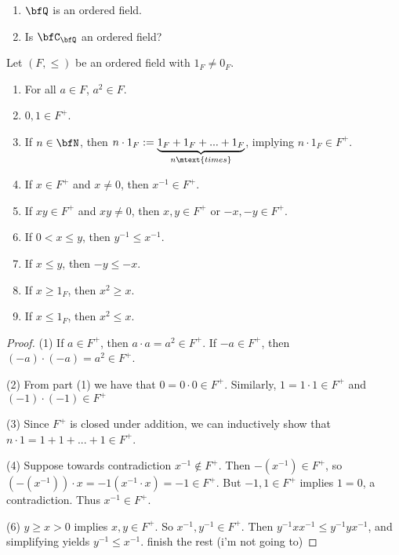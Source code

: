    \begin{example}
        \phantom{a}
        \begin{enumerate}[label = (\arabic*)]
            \item $\bfQ$ is an ordered field.
            \item Is $\bfC_\bfQ$ an ordered field?
        \end{enumerate}
    \end{example}

    \begin{proposition}
        Let $(F,\leq)$ be an ordered field with $1_F \neq 0_F$.
            \begin{enumerate}[label = (\arabic*)]
                \item For all $a \in F$, $a^2 \in F$.
                \item $0,1 \in F^+$.
                \item If $n \in \bfN$, then $n\cdot 1_F := \underbrace{1_F + 1_F + ... + 1_F}_{n\mtext{times}}$, implying $n \cdot 1_F \in F^+$.
                \item If $x \in F^+$ and $x \neq 0$, then $x^{-1} \in F^+$.
                \item If $xy \in F^+$ and $xy \neq 0$, then $x,y \in F^+$ or $-x,-y \in F^+$.
                \item If $0 < x \leq y$, then $y^{-1} \leq x^{-1}$.
                \item If $x \leq y$, then $-y \leq -x$.
                \item If $x \geq 1_F$, then $x^2 \geq x$.
                \item If $x \leq 1_F$, then $x^2 \leq x$.
            \end{enumerate}
    \end{proposition}
        \begin{proof}
            (1) If $a \in F^+$, then $a \cdot a  = a^2 \in F^+$. If $-a \in F^+$, then $(-a) \cdot (-a) = a^2 \in F^+$.

            (2) From part (1) we have that $0 = 0 \cdot 0 \in F^+$. Similarly, $1 = 1 \cdot 1 \in F^+$ and $(-1) \cdot (-1) \in F^+$

            (3) Since $F^+$ is closed under addition, we can inductively show that $n \cdot 1 = 1 + 1 + ... + 1 \in F^+$.

            (4) Suppose towards contradiction $x^{-1} \not\in F^+$. Then $-(x^{-1}) \in F^+$, so $(-(x^{-1}))\cdot x = -1(x^{-1}\cdot x) = -1 \in F^+$. But $-1,1 \in F^+$ implies $1 = 0$, a contradiction. Thus $x^{-1} \in F^+$.

            (6) $y \geq x > 0$ implies $x,y \in F^+$. So $x^{-1},y^{-1} \in F^+$. Then $y^{-1}xx^{-1} \leq y^{-1}yx^{-1}$, and simplifying yields $y^{-1} \leq x^{-1}$.
            {\color{red} finish the rest (i'm not going to)}
        \end{proof}
